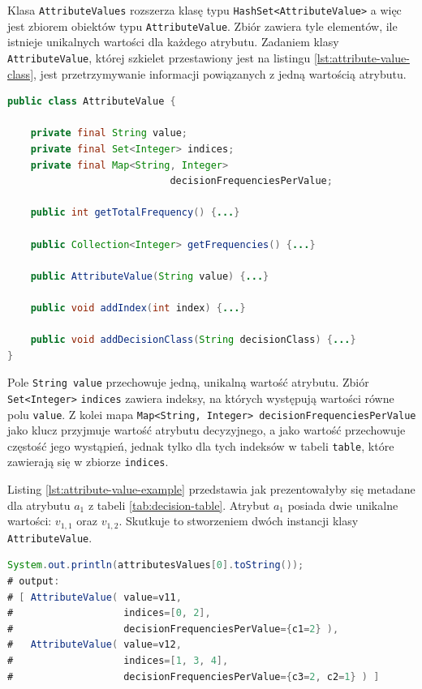 \documentclass[12pt]{article}
\begin{document}
Klasa \verb|AttributeValues| rozszerza klasę typu \verb|HashSet<AttributeValue>| a więc jest zbiorem obiektów typu \verb|AttributeValue|.
Zbiór zawiera tyle elementów, ile istnieje unikalnych wartości dla każdego atrybutu. Zadaniem klasy \verb|AttributeValue|, której szkielet przestawiony jest na
listingu \ref{lst:attribute-value-class}, jest przetrzymywanie informacji
powiązanych z jedną wartością atrybutu.

\begin{lstlisting}[language=java, caption=Skrócona implementacja klasy AttributeValue,frame=single,label={lst:attribute-value-class}]
public class AttributeValue {

    private final String value;
    private final Set<Integer> indices;
    private final Map<String, Integer>
                            decisionFrequenciesPerValue;

    public int getTotalFrequency() {...}

    public Collection<Integer> getFrequencies() {...}

    public AttributeValue(String value) {...}

    public void addIndex(int index) {...}

    public void addDecisionClass(String decisionClass) {...}
}
\end{lstlisting}
\newpage

Pole \verb|String value| przechowuje jedną, unikalną wartość atrybutu. Zbiór \verb|Set<Integer>| \verb|indices| zawiera indeksy, na których występują
wartości równe polu \verb|value|. Z kolei mapa \verb|Map<String, Integer> decisionFrequenciesPerValue| jako klucz przyjmuje wartość atrybutu decyzyjnego,
a jako wartość przechowuje częstość jego wystąpień, jednak tylko dla tych indeksów w tabeli \verb|table|, które zawierają się w zbiorze \verb|indices|.

Listing \ref{lst:attribute-value-example} przedstawia jak prezentowałyby się metadane dla atrybutu $a_1$ z tabeli \ref{tab:decision-table}.
Atrybut $a_1$ posiada dwie unikalne wartości: $v_{1,1}$ oraz $v_{1,2}$. Skutkuje to stworzeniem dwóch instancji klasy \verb|AttributeValue|.

\begin{lstlisting}[language=java, caption=Metadane na przykładzie atrybutu $a_1$ z tabeli \ref{tab:decision-table},frame=single,label={lst:attribute-value-example}]
System.out.println(attributesValues[0].toString());
# output:
# [ AttributeValue( value=v11,
#                   indices=[0, 2],
#                   decisionFrequenciesPerValue={c1=2} ),
#   AttributeValue( value=v12,
#                   indices=[1, 3, 4],
#                   decisionFrequenciesPerValue={c3=2, c2=1} ) ]
\end{lstlisting}
    
\end{document}
